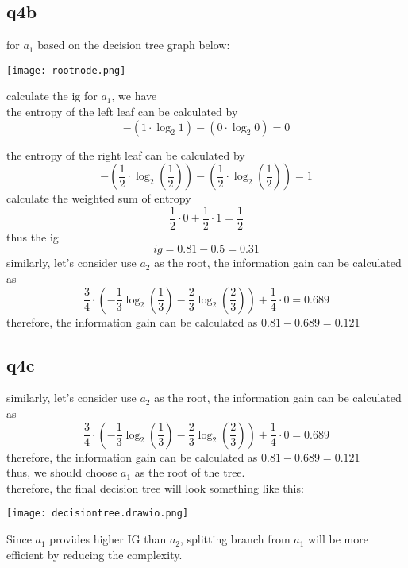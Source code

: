 \documentclass[12pt]{article}
\begin{document}
\newpage
\subsection{q4b}
\begin{tcolorbox}[myblock, title = answer]
  for \(a_1\) based on the decision tree graph below:
  \begin{center}
    \texttt{[image: rootnode.png]}
  \end{center}
  
  calculate the ig for \(a_1\), we have\\
  the entropy of the left leaf can be calculated by
  $$
  -(1 \cdot \log_{2}1) - (0 \cdot \log_{2}0) = 0
  $$

  the entropy of the right leaf can be calculated by
  $$
  -\left( \frac{1}{2} \cdot  \log_{2}\left( \frac{1}{2} \right) \right) - \left( \frac{1}{2}\cdot \log_{2}\left( \frac{1}{2} \right) \right) = 1
  $$
  calculate the weighted sum of entropy
  $$
  \frac{1}{2} \cdot 0 + \frac{1}{2} \cdot 1 = \frac{1}{2}
  $$
  thus the ig
  $$
  ig = 0.81 - 0.5 = 0.31
  $$
  similarly, let's consider use $a_{2}$ as the root, the information gain can be calculated as
  $$
  \frac{3}{4}\cdot\left( -\frac{1}{3}\log_{2}\left( \frac{1}{3} \right) - \frac{2}{3}\log_{2}\left( \frac{2}{3} \right)\right) + \frac{1}{4} \cdot 0 = 0.689
  $$
  therefore, the information gain can be calculated as $0.81 - 0.689 =  0.121$ \\
  
   
\end{tcolorbox}

\newpage
\subsection{q4c}
\begin{tcolorbox}[myblock, title = answer]
  similarly, let's consider use $a_{2}$ as the root, the information gain can be calculated as
  $$
  \frac{3}{4}\cdot\left( -\frac{1}{3}\log_{2}\left( \frac{1}{3} \right) - \frac{2}{3}\log_{2}\left( \frac{2}{3} \right)\right) + \frac{1}{4} \cdot 0 = 0.689
  $$
  therefore, the information gain can be calculated as $0.81 - 0.689 =  0.121$ \\
  thus, we should choose $a_{1}$ as the root of the tree. \\
  therefore, the final decision tree will look something like this:
  \begin{center}
    \texttt{[image: decisiontree.drawio.png]}
  \end{center} 
  Since \(a_1\) provides higher IG than \(a_2\), splitting branch from \(a_1\) will be more efficient by reducing the complexity.
\end{tcolorbox}
\end{document}

